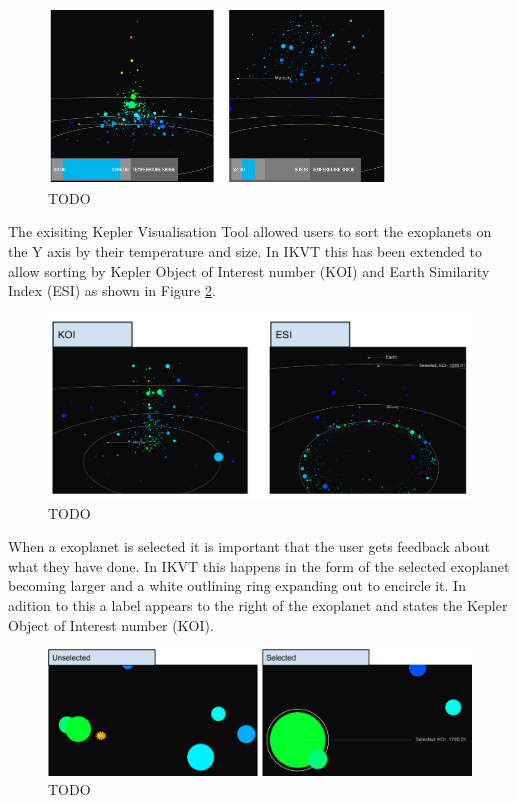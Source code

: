 \begin{figure}[H]
  \centering
      \includegraphics[width=0.8\textwidth]{images/zoomFilter.png}
  \caption{TODO~}  
    \label{fig:zoomFilter}
\end{figure}

The exisiting Kepler Visualisation Tool allowed users to sort the exoplanets on
the Y axis by their temperature and size. In IKVT this has been extended to
allow sorting by Kepler Object of Interest number (KOI) and Earth Similarity
Index (ESI) as shown in Figure \ref{fig:ESIKOI}.


\begin{figure}[H]
  \centering
      \includegraphics[width=1\textwidth]{images/ESIKOI.pdf}
  \caption{TODO~}  
    \label{fig:ESIKOI}
\end{figure}

When a exoplanet is selected it is important that the user gets feedback about
what they have done. In IKVT this happens in the form of the selected exoplanet
becoming larger and a white outlining ring expanding out to encircle it. In
adition to this a label appears to the right of the exoplanet and states the
Kepler Object of Interest number (KOI). 

\begin{figure}[H]
  \centering
      \includegraphics[width=1\textwidth]{images/selectedPlanet.jpg}
  \caption{TODO~}  
    \label{fig:selectedPlanet}
\end{figure}

